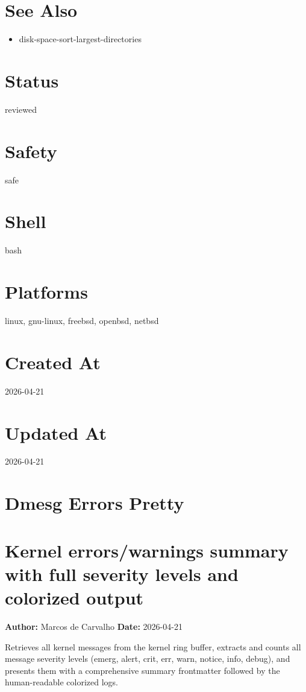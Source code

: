 \documentclass[openany]{book}
\begin{document}
\section*{See Also}
\begin{itemize}
  \item disk-space-sort-largest-directories
\end{itemize}

\section*{Status}
reviewed

\section*{Safety}
safe

\section*{Shell}
bash

\section*{Platforms}
linux, gnu-linux, freebsd, openbsd, netbsd

\section*{Created At}
2026-04-21

\section*{Updated At}
2026-04-21

\section{Dmesg Errors Pretty}
\section*{Kernel errors/warnings summary with full severity levels and colorized output}
\textbf{Author:} Marcos de Carvalho \hfill \textbf{Date:} 2026-04-21

\noindent Retrieves all kernel messages from the kernel ring buffer, extracts and counts all message severity levels (emerg, alert, crit, err, warn, notice, info, debug), and presents them with a comprehensive summary frontmatter followed by the human-readable colorized logs.
\end{document}
